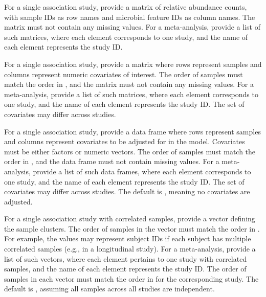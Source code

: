 \documentclass[a4paper]{book}
\begin{document}
\begin{Arguments}
\begin{ldescription}
\item[\code{rel.abd}] For a single association study, provide a matrix of relative abundance counts,
with sample IDs as row names and microbial feature IDs as column names.
The matrix must not contain any missing values.
For a meta-analysis, provide a list of such matrices, where each element corresponds
to one study, and the name of each element represents the study ID.

\item[\code{covariate.interest}] For a single association study, provide a matrix where rows represent samples
and columns represent numeric covariates of interest. The order of samples must match the order in ,
and the matrix must not contain any missing values.
For a meta-analysis, provide a list of such matrices, where each element corresponds to one study,
and the name of each element represents the study ID. The set of covariates may differ across studies.

\item[\code{covariate.adjust}] For a single association study, provide a data frame where rows represent samples
and columns represent covariates to be adjusted for in the model. Covariates must be either factors or numeric vectors.
The order of samples must match the order in , and the data frame must not contain missing values.
For a meta-analysis, provide a list of such data frames, where each element corresponds to one study,
and the name of each element represents the study ID. The set of covariates may differ across studies.
The default is , meaning no covariates are adjusted.

\item[\code{cluster}] For a single association study with correlated samples, provide a vector defining
the sample clusters. The order of samples in the vector must match the order in .
For example, the values may represent subject IDs if each subject has multiple correlated samples
(e.g., in a longitudinal study).
For a meta-analysis, provide a list of such vectors, where each element pertains to one study with correlated samples,
and the name of each element represents the study ID. The order of samples in each vector must match the order in
 for the corresponding study.
The default is , assuming all samples across all studies are independent.


\end{ldescription}
\end{Arguments}
\end{document}
